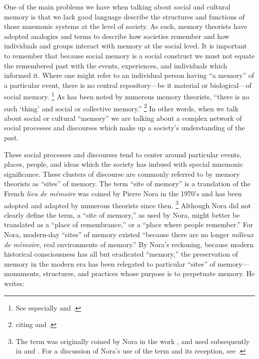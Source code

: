 One of the main problems we have when talking about social and cultural memory is that we lack good language describe the structures and functions of those mnemonic systems at the level of society. As such, memory theorists have adopted analogies and terms to describe how societies remember and how individuals and groups interact with memory at the social level. It is important to remember that because social memory is a social construct we must not equate the remembered past with the events, experiences, and individuals which informed it. Where one might refer to an individual person having ``a memory'' of a particular event, there is no central repository---be it material or biological---of social memory.%
    \footnote{%
        See especially 
        \cite{brockmeier_cp2010} and 
        \cite{wertsch_cp2011}.}  
As has been noted by numerous memory theorists, ``there is no such `thing' and social or collective memory.''%
    \footnote{%
        \Cite[14]{wilson2017} citing 
        \cite[112]{olick-robbins_ars1998} and 
        \cite[118--24]{wertsch_boyer-wertsch2009}.}
In other words, when we talk about social or cultural ``memory'' we are talking about a complex network of social processes and discourses which make up a society's understanding of the past.

These social processes and discourses tend to center around particular events, places, people, and ideas which the society has imbued with special mnemonic significance. These clusters of discourse are commonly referred to by memory theorists as ``sites'' of memory. The term ``site of memory'' is a translation of the French \emph{lieu de mémoire} was coined by Pierre Nora in the 1970's and has been adopted and adapted by numerous theorists since then.%
    \footnote{%
        The term was originally coined by Nora in the work
        \cite*{nora_goff-etal1978}, and used subsequently in 
        \cite*{nora1984} and 
        \cite*{nora_representations1989}. For a discussion of Nora's use of the term and its reception, see 
        \cite{szpociński_teksty-drugie2016}.}
Although Nora did not clearly define the term, a ``site of memory,'' as used by Nora, might better be translated as a ``place of remembrance,'' or a ``place where people remember.'' For Nora, modern-day ``sites'' of memory existed ``because there are no longer \emph{milieux de mémoire}, real environments of memory.''%
    \autocite[7]{nora_representations1989}
By Nora's reckoning, because modern historical consciousness has all but eradicated ``memory,'' the preservation of memory in the modern era has been relegated to particular ``sites'' of memory---monuments, structures, and practices whose purpose is to perpetuate memory. He writes:

